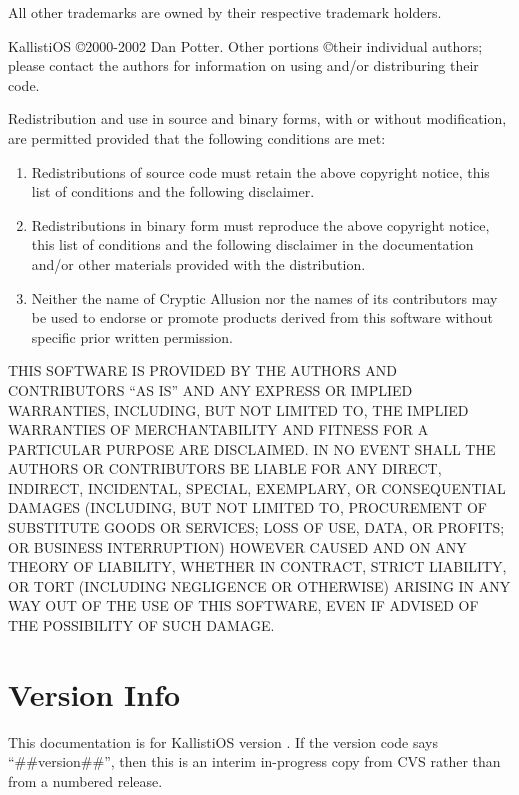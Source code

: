 \documentclass[english]{report}
\begin{document}
All other trademarks are owned by their respective trademark holders.

KallistiOS \copyright 2000-2002 Dan Potter. Other portions \copyright their individual
authors; please contact the authors for information on using and/or
distriburing their code.

Redistribution and use in source and binary forms, with or without
modification, are permitted provided that the following conditions
are met:

\begin{enumerate}
\item Redistributions of source code must retain the above copyright notice,
this list of conditions and the following disclaimer. 
\item Redistributions in binary form must reproduce the above copyright
notice, this list of conditions and the following disclaimer in the
documentation and/or other materials provided with the distribution. 
\item Neither the name of Cryptic Allusion nor the names of its contributors
may be used to endorse or promote products derived from this software
without specific prior written permission.
\end{enumerate}
THIS SOFTWARE IS PROVIDED BY THE AUTHORS AND CONTRIBUTORS ``AS IS''
AND ANY EXPRESS OR IMPLIED WARRANTIES, INCLUDING, BUT NOT LIMITED
TO, THE IMPLIED WARRANTIES OF MERCHANTABILITY AND FITNESS FOR A PARTICULAR
PURPOSE ARE DISCLAIMED. IN NO EVENT SHALL THE AUTHORS OR CONTRIBUTORS
BE LIABLE FOR ANY DIRECT, INDIRECT, INCIDENTAL, SPECIAL, EXEMPLARY,
OR CONSEQUENTIAL DAMAGES (INCLUDING, BUT NOT LIMITED TO, PROCUREMENT
OF SUBSTITUTE GOODS OR SERVICES; LOSS OF USE, DATA, OR PROFITS; OR
BUSINESS INTERRUPTION) HOWEVER CAUSED AND ON ANY THEORY OF LIABILITY,
WHETHER IN CONTRACT, STRICT LIABILITY, OR TORT (INCLUDING NEGLIGENCE
OR OTHERWISE) ARISING IN ANY WAY OUT OF THE USE OF THIS SOFTWARE,
EVEN IF ADVISED OF THE POSSIBILITY OF SUCH DAMAGE.



\chapter*{Version Info}

This documentation is for KallistiOS version \kosversion. If the version
code says ``\#{}\#version\#\#'', then this is an interim in-progress copy
from CVS rather than from a numbered release.
\end{document}
